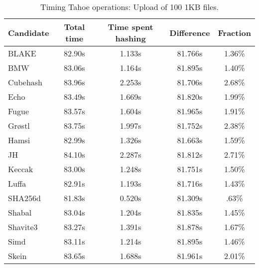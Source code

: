 \begin{table}[h]
  \centering
  \begin{tabular}{ | l | c | c | c | c | }
    \hline
    Candidate & Total time & Time spent hashing & Difference & Fraction \\ \hline
    BLAKE     &  82.90s  &  1.133s  &  81.766s  &  1.36\%  \\  \hline
    BMW       &  83.06s  &  1.164s  &  81.895s  &  1.40\%  \\  \hline
    Cubehash  &  83.96s  &  2.253s  &  81.706s  &  2.68\%  \\  \hline
    Echo      &  83.49s  &  1.669s  &  81.820s  &  1.99\%  \\  \hline
    Fugue     &  83.57s  &  1.604s  &  81.965s  &  1.91\%  \\  \hline
    Grøstl    &  83.75s  &  1.997s  &  81.752s  &  2.38\%  \\  \hline
    Hamsi     &  82.99s  &  1.326s  &  81.663s  &  1.59\%  \\  \hline
    JH        &  84.10s  &  2.287s  &  81.812s  &  2.71\%  \\  \hline
    Keccak    &  83.00s  &  1.248s  &  81.751s  &  1.50\%  \\  \hline
    Luffa     &  82.91s  &  1.193s  &  81.716s  &  1.43\%  \\  \hline
    SHA256d   &  81.83s  &  0.520s  &  81.309s  &  .63\%   \\  \hline
    Shabal    &  83.04s  &  1.204s  &  81.835s  &  1.45\%  \\  \hline
    Shavite3  &  83.27s  &  1.391s  &  81.878s  &  1.67\%  \\  \hline
    Simd      &  83.11s  &  1.214s  &  81.895s  &  1.46\%  \\  \hline
    Skein     &  83.65s  &  1.688s  &  81.961s  &  2.01\%  \\  \hline
  \end{tabular}
  \caption{Timing Tahoe operations: Upload of 100 1KB files.}
  \label{tbl:hashingtimes:put1kb}
\end{table}

